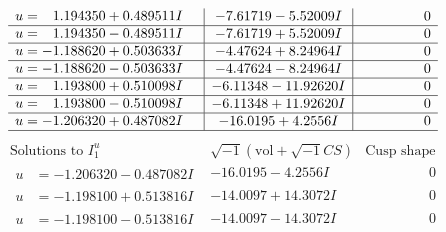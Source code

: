 \documentclass[1p]{elsarticle_modified}
\theoremstyle{definition}
\newcommand{\I}{\sqrt{-1}}
\begin{document}
$$\begin{array}{c|c|c}
\begin{aligned}
u &= \phantom{-}1.194350 + 0.489511 I\end{aligned}
 & -7.61719 - 5.52009 I & \phantom{-0.000000 } 0 \\ \hline\begin{aligned}
u &= \phantom{-}1.194350 - 0.489511 I\end{aligned}
 & -7.61719 + 5.52009 I & \phantom{-0.000000 } 0 \\ \hline\begin{aligned}
u &= -1.188620 + 0.503633 I\end{aligned}
 & -4.47624 + 8.24964 I & \phantom{-0.000000 } 0 \\ \hline\begin{aligned}
u &= -1.188620 - 0.503633 I\end{aligned}
 & -4.47624 - 8.24964 I & \phantom{-0.000000 } 0 \\ \hline\begin{aligned}
u &= \phantom{-}1.193800 + 0.510098 I\end{aligned}
 & -6.11348 - 11.92620 I & \phantom{-0.000000 } 0 \\ \hline\begin{aligned}
u &= \phantom{-}1.193800 - 0.510098 I\end{aligned}
 & -6.11348 + 11.92620 I & \phantom{-0.000000 } 0 \\ \hline\begin{aligned}
u &= -1.206320 + 0.487082 I\end{aligned}
 & -16.0195 + 4.2556 I & \phantom{-0.000000 } 0\\
 \hline 
 \end{array}$$\newpage$$\begin{array}{c|c|c}  
\text{Solutions to }I^u_{1}& \I (\text{vol} + \sqrt{-1}CS) & \text{Cusp shape}\\
 \hline 
\begin{aligned}
u &= -1.206320 - 0.487082 I\end{aligned}
 & -16.0195 - 4.2556 I & \phantom{-0.000000 } 0 \\ \hline\begin{aligned}
u &= -1.198100 + 0.513816 I\end{aligned}
 & -14.0097 + 14.3072 I & \phantom{-0.000000 } 0 \\ \hline\begin{aligned}
u &= -1.198100 - 0.513816 I\end{aligned}
 & -14.0097 - 14.3072 I & \phantom{-0.000000 } 0 \\ \hline\begin{aligned}

\end{aligned}
\end{array}$$
\end{document}
